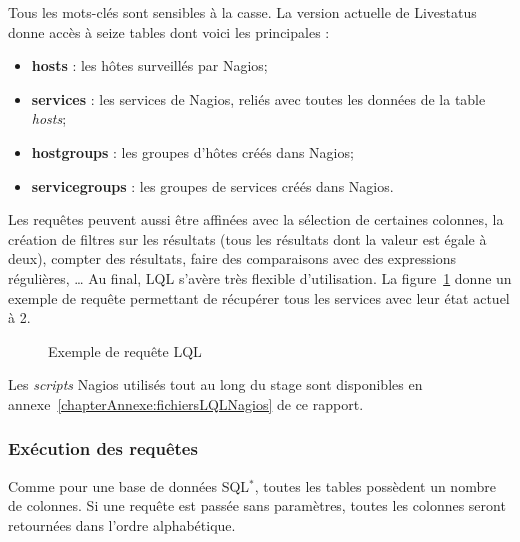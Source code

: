 Tous les mots-cl\'es sont sensibles \`a la casse. 
La version actuelle de Livestatus donne acc\`es \`a seize tables dont voici les principales :

\begin{itemize}
	\item \textbf{hosts} : les h\^otes surveill\'es par Nagios;
	\item \textbf{services} : les services de Nagios, reli\'es avec toutes les donn\'ees de la table \textit{hosts};
	\item \textbf{hostgroups} : les groupes d'h\^otes cr\'e\'es dans Nagios;
	\item \textbf{servicegroups} : les groupes de services cr\'e\'es dans Nagios.

\end{itemize}

\vspace{0.20cm}

Les requ\^etes peuvent aussi \^etre affin\'ees avec la s\'election de certaines colonnes, la cr\'eation de filtres sur les r\'esultats (tous les r\'esultats dont la valeur est \'egale \`a deux), compter des r\'esultats, faire des comparaisons avec des expressions r\'eguli\`eres, \ldots{}
Au final, LQL s'av\`ere tr\`es flexible d'utilisation.
La figure~\ref{code:exempleLQL} donne un exemple de requ\^ete permettant de r\'ecup\'erer tous les services avec leur \'etat actuel \`a 2.

\vspace{0.20cm}

\begin{figure}[!ht]
	
	\caption{Exemple de requ\^ete LQL}
	\label{code:exempleLQL}

\end{figure}

Les \textit{scripts} Nagios utilis\'es tout au long du stage sont disponibles en annexe~\ref{chapterAnnexe:fichiersLQLNagios} de ce rapport.

\subsubsection{Ex\'ecution des requ\^etes}

Comme pour une base de donn\'ees SQL$^*$, toutes les tables poss\`edent un nombre de colonnes.
Si une requ\^ete est pass\'ee sans param\`etres, toutes les colonnes seront retourn\'ees dans l'ordre alphab\'etique.

